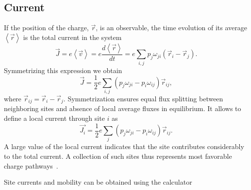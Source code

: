 \subsection{Current}
\label{sec:vaverage}
If the position of the charge, $\vec{r}$, is an observable, the time evolution of its average $\left<\vec{r}\right>$ is the total current in the system
\begin{equation}
 \vec{J} = e \left< \vec{v} \right> = e \frac{d \left< \vec{r}
   \right>} {dt} = e \sum_{i, j} p_{j} \omega_{ji} ( \vec{r}_i -
 \vec{r}_j ) .
\label{equ:current_def}
\end{equation}
Symmetrizing this expression we obtain
\begin{equation}
  \vec{J} = \frac{1}{2} e \sum_{i, j} \left( p_{j} 
  \omega_{ji} - p_{i} \omega_{ij} \right) \vec{r}_{ij} ,
 \label{equ:current}
\end{equation}
where $\vec{r}_{ij} = \vec{r}_{i} - \vec{r}_{j}$. Symmetrization ensures equal flux
splitting between neighboring sites and absence of local average fluxes in equilibrium. It allows to define a local current through site $i$ as
\begin{equation}
  \vec{J_i} = \frac{1}{2} e \sum_{ j} \left( p_{j}  \omega_{ji} - p_{i} \omega_{ij} \right) \vec{r}_{ij} .
 \label{equ:site_current}
\end{equation}
A large value of the local current indicates that the site contributes considerably to the total current. A collection of such sites thus represents most favorable charge pathways~\cite{van_der_holst_modeling_2009}.

Site currents and mobility can be obtained using the  calculator
\vskip 0.2cm
{\noindent \small \ctprun \opt \xmloptions  \seg  \xmlsegments \sql  \sqlstate \exe {} }


